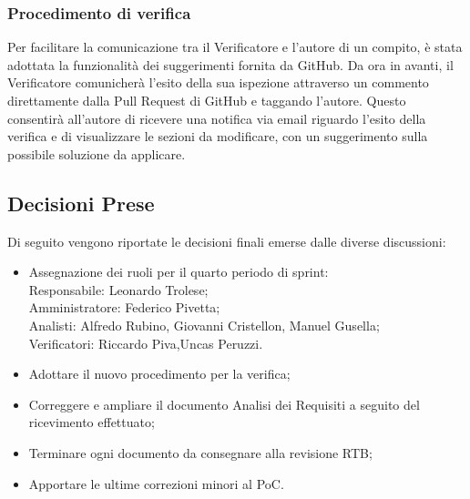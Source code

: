 \documentclass[10pt]{article}
\begin{document}
\subsubsection{Procedimento di verifica}
Per facilitare la comunicazione tra il Verificatore e l'autore di un compito, è stata adottata la funzionalità dei suggerimenti fornita da GitHub. Da ora in avanti, il Verificatore comunicherà l'esito della sua ispezione attraverso un commento direttamente dalla Pull Request di GitHub e taggando l'autore. Questo consentirà all'autore di ricevere una notifica via email riguardo l'esito della verifica e di visualizzare le sezioni da modificare, con un suggerimento sulla possibile soluzione da applicare.

\subsection{Decisioni Prese}
Di seguito vengono riportate le decisioni finali emerse dalle diverse discussioni:
\begin{itemize}
    \item Assegnazione dei ruoli per il quarto periodo di sprint:\\
            \vspace{1mm}
            Responsabile: Leonardo Trolese;\\
            Amministratore: Federico Pivetta;\\
            Analisti: Alfredo Rubino, Giovanni Cristellon, Manuel Gusella;\\
            Verificatori: Riccardo Piva,Uncas Peruzzi.\\
    \item Adottare il nuovo procedimento per la verifica;
    \item Correggere e ampliare il documento Analisi dei Requisiti a seguito del ricevimento effettuato;
    \item Terminare ogni documento da consegnare alla revisione RTB;
    \item Apportare le ultime correzioni minori al PoC.
\end{itemize}
\end{document}
